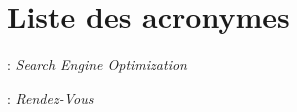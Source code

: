 
\chapter*{Liste des acronymes}
\begin{acronym}
\Large
{} :  {\emph{Search Engine Optimization}}

 :  {\emph{Rendez-Vous }}
\end{acronym}
\normalsize
